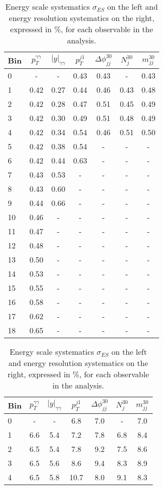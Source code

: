 \begin{table}[h]
\centering
\tiny
\caption{Energy scale systematics $\sigma_{ES}$ on the left and energy resolution systematics on the right, expressed in \%, for each observable in the analysis.}
\label{ES_ER_table}
\begin{tabular}{l | cccccc}
Bin & $p_T^{\gamma\gamma}$ & $|y|_{\gamma\gamma}$ & $p_T^{j1}$ & $\Delta\phi_{jj}^{30}$ & $N_j^{30}$ & $m_{jj}^{30}$ \\
\hline
0 & - & - & 0.43 & 0.43 & - & 0.43 \\
1 & 0.42 & 0.27 & 0.44 & 0.46 & 0.43 & 0.48 \\
2 & 0.42 & 0.28 & 0.47 & 0.51 & 0.45 & 0.49 \\
3 & 0.42 & 0.30 & 0.49 & 0.51 & 0.48 & 0.49 \\
4 & 0.42 & 0.34 & 0.54 & 0.46 & 0.51 & 0.50 \\
5 & 0.42 & 0.38 & 0.54 & - & - & - \\
6 & 0.42 & 0.44 & 0.63 & - & - & - \\
7 & 0.43 & 0.53 & - & - & - & - \\
8 & 0.43 & 0.60 & - & - & - & - \\
9 & 0.44 & 0.66 & - & - & - & - \\
10 & 0.46 & - & - & - & - & - \\
11 & 0.47 & - & - & - & - & - \\
12 & 0.48 & - & - & - & - & - \\
13 & 0.50 & - & - & - & - & - \\
14 & 0.53 & - & - & - & - & - \\
15 & 0.55 & - & - & - & - & - \\
16 & 0.58 & - & - & - & - & - \\
17 & 0.62 & - & - & - & - & - \\
18 & 0.65 & - & - & - & - & - \\
\end{tabular} \qquad
\begin{tabular}{l | cccccc}
Bin & $p_T^{\gamma\gamma}$ & $|y|_{\gamma\gamma}$ & $p_T^{j1}$ & $\Delta\phi_{jj}^{30}$ & $N_j^{30}$ & $m_{jj}^{30}$ \\
\hline
0 & - & - & 6.8 & 7.0 & - & 7.0 \\ 
1 & 6.6 & 5.4 & 7.2 & 7.8 & 6.8 & 8.4 \\
2 & 6.5 & 5.4 & 7.8 & 9.2 & 7.5 & 8.6 \\
3 & 6.5 & 5.6 & 8.6 & 9.4 & 8.3 & 8.9 \\
4 & 6.5 & 5.8 & 10.7 & 8.0 & 9.1 & 8.3 \\

\end{tabular}
\end{table}
